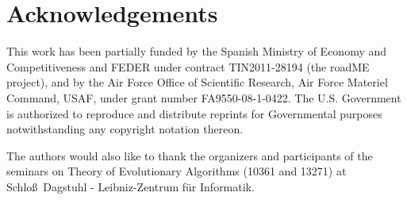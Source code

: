 \documentclass{article}
\begin{document}
\section{Acknowledgements}

This work has been partially funded by the Spanish Ministry of Economy and Competitiveness and FEDER under contract TIN2011-28194 (the
roadME project), and by the Air Force Office of
Scientific Research, Air Force Materiel Command, USAF, under grant
number FA9550-08-1-0422. The U.S. Government is authorized to
reproduce and distribute reprints for Governmental purposes
notwithstanding any copyright notation thereon.

The authors would also like to thank the organizers and participants
of the seminars on Theory of Evolutionary Algorithms (10361 and 13271) at
Schlo\ss\ Dagstuhl - Leibniz-Zentrum f\"ur Informatik.




\end{document}
